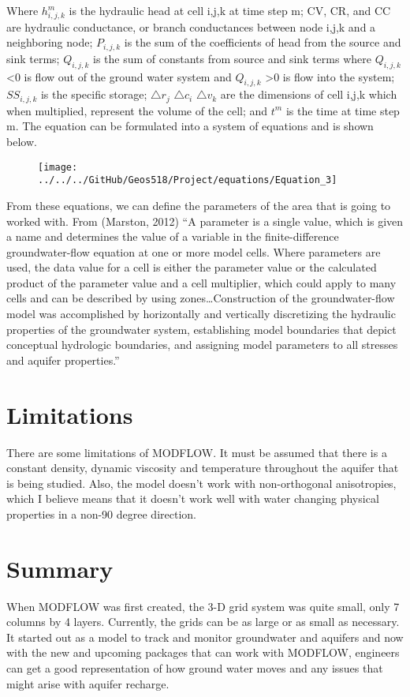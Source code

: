 \documentclass[]{report}
\begin{document}
Where $h^{m}_{i,j,k}$ is the hydraulic head at cell i,j,k at time step m; CV, CR, and CC are hydraulic conductance, or branch conductances between node i,j,k and a neighboring node; $P_{i,j,k}$ is the sum of the coefficients of head from the source and sink terms; $Q_{i,j,k}$ is the sum of constants from source and sink terms where $Q_{i,j,k}$\textless 0 is flow out of the ground water system and $Q_{i,j,k}$ \textgreater 0 is flow into the system; $SS_{i,j,k}$ is the specific storage; $\bigtriangleup r_{j}$ $\bigtriangleup c_{i}$ $\bigtriangleup v_{k}$ are the dimensions of cell i,j,k which when multiplied, represent the volume of the cell; and $t^{m}$ is the time at time step m. The equation can be formulated into a system of equations and is shown below.  

\begin{figure}[h]
	\centering
	\texttt{[image: ../../../GitHub/Geos518/Project/equations/Equation\_3]}
\end{figure}


From these equations, we can define the parameters of the area that is going to worked with. From (Marston, 2012) “A parameter is a single value, which is given a name and determines the value of a variable in the finite-difference groundwater-flow equation at one or more model cells. Where parameters are used, the data value for a cell is either the parameter value or the calculated product of the parameter value and a cell multiplier, which could apply to many cells and can be described by using zones…Construction of the groundwater-flow model was accomplished by horizontally and vertically discretizing the hydraulic properties of the groundwater system, establishing model boundaries that depict conceptual hydrologic boundaries, and assigning model parameters to all stresses and aquifer properties.”\\
\section{Limitations}
There are some limitations of MODFLOW. It must be assumed that there is a constant density, dynamic viscosity and temperature throughout the aquifer that is being studied. Also, the model doesn’t work with non-orthogonal anisotropies, which I believe means that it doesn’t work well with water changing physical properties in a non-90 degree direction. \\
\section{Summary}
When MODFLOW was first created, the 3-D grid system was quite small, only 7 columns by 4 layers. Currently, the grids can be as large or as small as necessary. It started out as a model to track and monitor groundwater and aquifers and now with the new and upcoming packages that can work with MODFLOW, engineers can get a good representation of how ground water moves and any issues that might arise with aquifer recharge. \\
\end{document}
